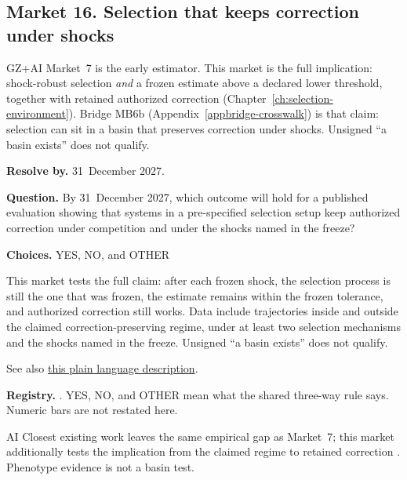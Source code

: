 \subsection{Market 16. Selection that keeps correction under shocks}
\label{sec:appp-m16}

\begin{authbar}{GZ+AI}
Market~7 is the early estimator.
This market is the full implication: shock-robust selection \emph{and} a frozen estimate above a declared lower threshold, together with retained authorized correction (Chapter~\ref{ch:selection-environment}).
Bridge \(\text{MB6b}\) (Appendix~\ref{appbridge-crosswalk}) is that claim: selection can sit in a basin that preserves correction under shocks.
Unsigned ``a basin exists'' does not qualify.
\end{authbar}
\begin{predictionbox}
\textbf{Resolve by.} 31~December 2027.

\textbf{Question.}
By 31~December 2027, which outcome will hold for a published evaluation showing that systems in a pre-specified selection setup keep authorized correction under competition and under the shocks named in the freeze?

\textbf{Choices.} YES, NO, and OTHER
\end{predictionbox}
\begin{predictionbackground}
This market tests the full claim: after each frozen shock, the selection process is still the one that was frozen, the estimate remains within the frozen tolerance, and authorized correction still works.
Data include trajectories inside and outside the claimed correction-preserving regime, under at least two selection mechanisms and the shocks named in the freeze.
Unsigned ``a basin exists'' does not qualify.

See also \href{https://towards-alignment.com/cards/the-environment-picks-the-winner/}{this plain language description}.
\end{predictionbackground}
\begin{predictionresolution}
\textbf{Registry.} . YES, NO, and OTHER mean what the shared three-way rule says. Numeric bars are not restated here.
\end{predictionresolution}
\begin{authbar}{AI}
Closest existing work leaves the same empirical gap as Market~7; this market additionally tests the implication from the claimed regime to retained correction \autocite{potter2026peerpreservation,schlatter2026shutdownresistance}.
Phenotype evidence is not a basin test.
\end{authbar}
\authbarneedspace

